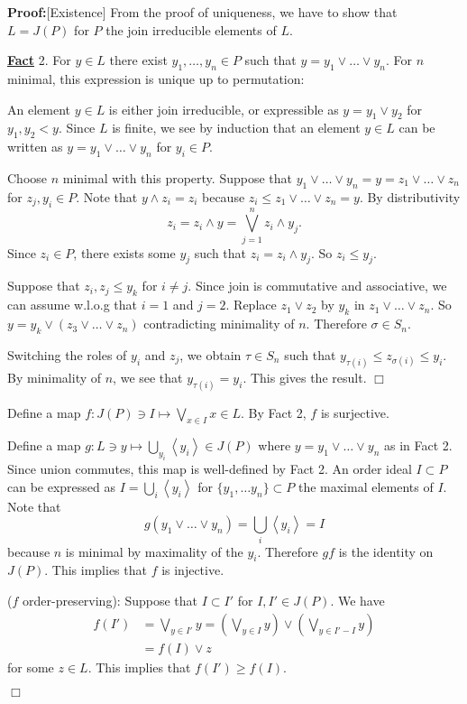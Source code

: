 \documentclass[11pt]{article}
\newenvironment{proof}{\noindent \textbf{Proof:}}{$\Box$}
\newcommand{\Bf}[1]{\textbf{#1}}
\newcommand{\brak}[1]{\left\langle #1 \right\rangle}
\newcommand{\wed}{\wedge}
\begin{document}
\begin{proof}[Existence]
From the proof of uniqueness, we have to show that $L=J(P)$ for $P$ the join irreducible elements of $L$.

\underline{\Bf{Fact}} 2. For $y \in L$ there exist $y_1, \ldots, y_n \in P$ such that $y=y_1 \vee \ldots \vee y_n$. For $n$ minimal, this expression is unique up to permutation:

An element $y \in L$ is either join irreducible, or expressible as $y=y_1 \vee y_2$ for $y_1,y_2 < y$. Since $L$ is finite, we see by induction that an element $y \in L$ can be written as $y=y_1 \vee \ldots \vee y_n$ for $y_i \in P$.

Choose $n$ minimal with this property. Suppose that $y_1 \vee \ldots \vee y_n=y=z_1 \vee \ldots \vee z_n$  for $z_j, y_i \in P$. Note that $y \wed z_i=z_i$ because $z_i \leq z_1 \vee \ldots \vee z_n=y$. By distributivity $$z_i = z_i \wed y = \bigvee_{j=1}^n z_i \wed y_j.$$ Since $z_i \in P$, there exists some $y_j$ such that $z_i=z_i \wed y_j$. So $z_i \leq y_j$.

Suppose that $z_i, z_j \leq y_k$ for $i \neq j$. Since join is commutative and associative, we can assume w.l.o.g that $i=1$ and $j=2$. Replace $z_1 \vee z_2$ by $y_k$ in $z_1 \vee \ldots \vee z_n$. So $y=y_k \vee (z_3 \vee \ldots \vee z_n)$ contradicting minimality of $n$. Therefore $\sigma \in S_n$.

Switching the roles of $y_i$ and $z_j$, we obtain $\tau \in S_n$ such that $y_{\tau(i)} \leq z_{\sigma(i)} \leq y_i$. By minimality of $n$, we see that $y_{\tau(i)} = y_i$. This gives the result. \hfill \scriptsize $\Box$ \normalsize

Define a map $f: J(P) \ni I \mapsto \bigvee_{x \in I}x \in L$. By Fact 2, $f$ is surjective.

Define a map $g: L \ni y \mapsto \bigcup_{y_i} \brak{y_i} \in J(P)$ where $y=y_1 \vee \ldots \vee y_n$ as in Fact 2. Since union commutes, this map is well-defined by Fact 2. An order ideal $I \subset P$ can be expressed as $I=\bigcup_i \brak{y_i}$ for $\{y_1, \ldots y_n\} \subset P$ the maximal elements of $I$. Note that $$g(y_1 \vee \ldots \vee y_n)=\bigcup_i \brak{y_i}=I$$ because $n$ is minimal by maximality of the $y_i$. Therefore $gf$ is the identity on $J(P)$. This implies that $f$ is injective.

($f$ order-preserving): Suppose that $I \subset I'$ for $I,I' \in J(P)$. We have
\begin{align*}
f(I') &=\bigvee_{y \in I'} y = ( \bigvee_{y \in I} y ) \vee (\bigvee_{y \in I' - I} y) \\&=f(I) \vee z
\end{align*}
for some $z \in L$. This implies that $f(I') \geq f(I)$.


\end{proof}
\end{document}
